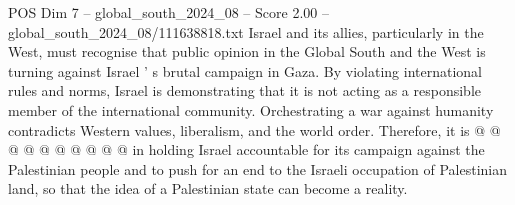 \begin{textsample}{POS Dim 7 – global\_south\_2024\_08 – Score 2.00 – global\_south\_2024\_08/111638818.txt}
Israel and its allies, particularly in the West, must recognise that public opinion in the Global South and the West is turning against Israel ' s brutal campaign in Gaza.
By violating international rules and norms, Israel is demonstrating that it is not acting as a responsible member of the international community.
Orchestrating a war against humanity contradicts Western values, liberalism, and the world order.
Therefore, it is @ @ @ @ @ @ @ @ @ @ in holding Israel accountable for its campaign against the Palestinian people and to push for an end to the Israeli occupation of Palestinian land, so that the idea of a Palestinian state can become a reality.

\end{textsample}
